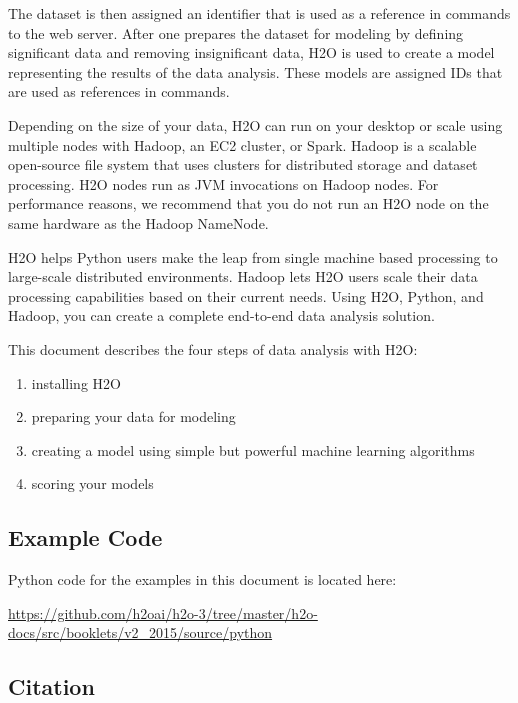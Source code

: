 The dataset is then assigned an identifier that is used as a reference in  commands to the web server.
After one prepares the dataset for modeling by defining significant data and removing insignificant data,
H2O is used to create a model representing the results of the data analysis.
These models are assigned IDs that are used as references in commands.

Depending on the size of your data,  H2O can run on your desktop or scale using multiple nodes with Hadoop,
an EC2 cluster, or Spark.  Hadoop is a scalable open-source file
system that uses clusters for distributed storage and dataset processing. H2O nodes run as JVM invocations on Hadoop
nodes. For performance reasons, we recommend that you do not run an H2O node on the same hardware as the Hadoop
NameNode.

H2O helps Python users make the leap from single machine based processing to large-scale distributed environments.
Hadoop lets H2O users scale their data processing capabilities based on their current needs.
Using H2O, Python, and Hadoop, you can create a complete end-to-end data analysis solution.

This document describes the four steps of data analysis with H2O:
\begin{enumerate}

\item installing H2O
\item preparing your data for modeling
\item creating a model using simple but powerful machine learning algorithms
\item scoring your models

\end{enumerate}

\newpage


\subsection{Example Code}

Python code for the examples in this document is located here:

\url{https://github.com/h2oai/h2o-3/tree/master/h2o-docs/src/booklets/v2_2015/source/python}

\subsection{Citation}

